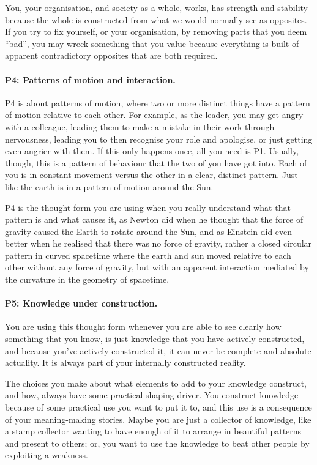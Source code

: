 You, your organisation, and society  as a whole, works, has strength and stability because the whole is constructed from what we would normally see as opposites. If you try to fix yourself, or your organisation, by removing parts that you deem “bad”, you may wreck something that you value because everything is built of apparent contradictory opposites that are both required.
\paragraph{\textbf{P4: Patterns of motion and interaction.}}
P4 is about patterns of motion, where two or more distinct things have a pattern of motion relative to each other. For example, as the leader, you may get angry with a colleague, leading them to make a mistake in their work through nervousness, leading you to then recognise your role and apologise, or just getting even angrier with them. If this only happens once, all you need is P1. Usually, though, this is a pattern of behaviour that the two of you have got into. Each of you is in constant movement versus the other in a clear, distinct pattern. Just like the earth is in a pattern of motion around the Sun. 


P4 is the thought form you are using when you really understand what that pattern is and what causes it, as Newton  did when he thought that the force of gravity caused the Earth to rotate around the Sun, and as Einstein  did even better when he realised that there was no force of gravity, rather a closed circular pattern in curved spacetime where the earth and sun moved relative to each other without any force of gravity, but with an apparent interaction mediated by the curvature in the geometry of spacetime. 
\paragraph{\textbf{P5: Knowledge under construction.}}
You are using this thought form whenever you are able to see clearly how something that you know, is just knowledge that you have actively constructed, and because you've actively constructed it, it can never be complete and absolute actuality.  It is always part of your internally constructed reality. 


The choices you make about what elements to add to your knowledge construct, and how, always have some practical shaping driver. You construct knowledge because of some practical use you want to put it to, and this use is a consequence of your meaning-making stories. Maybe you are just a collector of knowledge, like a stamp collector wanting to have enough of it to arrange in beautiful patterns and present to others; or, you want to use the knowledge to beat other people by exploiting a weakness.


